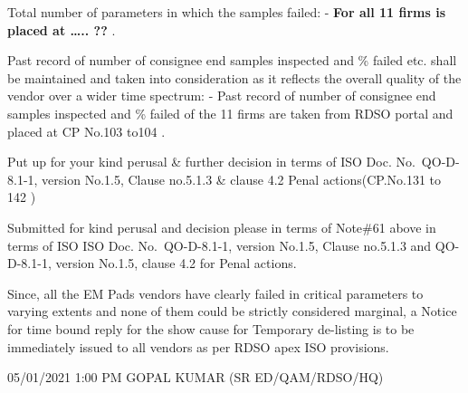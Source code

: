 \documentclass[nofonts,]{tufte-book}
\begin{document}
Total number of parameters in which the samples failed: - \textbf{For
all 11 firms is placed at \ldots.. ?? }.

Past record of number of consignee end samples inspected and \% failed
etc. shall be maintained and taken into consideration as it reflects the
overall quality of the vendor over a wider time spectrum: - Past record
of number of consignee end samples inspected and \% failed of the 11
firms are taken from RDSO portal and placed at CP No.103 to104 .

Put up for your kind perusal \& further decision in terms of ISO Doc.
No.~QO-D-8.1-1, version No.1.5, Clause no.5.1.3 \& clause 4.2 Penal
actions(CP.No.131 to 142 )

Submitted for kind perusal and decision please in terms of Note\#61
above in terms of ISO ISO Doc. No.~QO-D-8.1-1, version No.1.5, Clause
no.5.1.3 and QO-D-8.1-1, version No.1.5, clause 4.2 for Penal actions.

Since, all the EM Pads vendors have clearly failed in critical
parameters to varying extents and none of them could be strictly
considered marginal, a Notice for time bound reply for the show cause
for Temporary de-listing is to be immediately issued to all vendors as
per RDSO apex ISO provisions.

05/01/2021 1:00 PM GOPAL KUMAR (SR ED/QAM/RDSO/HQ)


\end{document}

